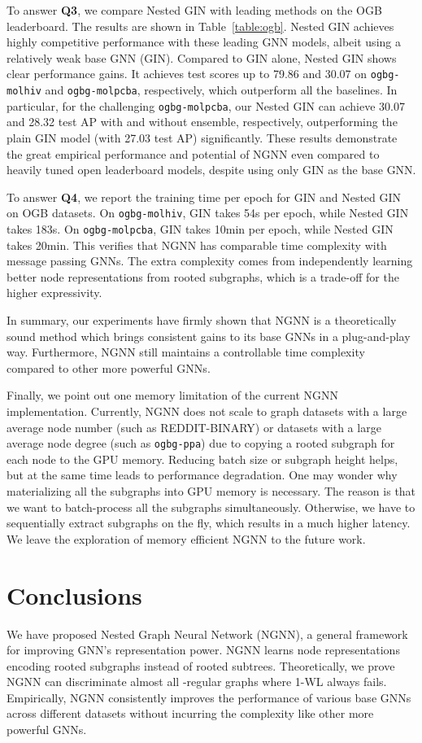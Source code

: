 \documentclass{article}
\begin{document}
To answer \textbf{Q3}, we compare Nested GIN with leading methods on the OGB leaderboard. The results are shown in Table~\ref{table:ogb}. Nested GIN achieves highly competitive performance with these leading GNN models, albeit using a relatively weak base GNN (GIN). Compared to GIN alone, Nested GIN shows clear performance gains. It achieves test scores up to 79.86 and 30.07 on \texttt{ogbg-molhiv} and \texttt{ogbg-molpcba}, respectively, which outperform all the baselines. In particular, for the challenging \texttt{ogbg-molpcba}, our Nested GIN can achieve 30.07 and 28.32 test AP with and without ensemble, respectively, outperforming the plain GIN model (with 27.03 test AP) significantly. These results demonstrate the great empirical performance and potential of NGNN even compared to heavily tuned open leaderboard models, despite using only GIN as the base GNN. 

To answer \textbf{Q4}, we report the training time per epoch for GIN and Nested GIN on OGB datasets. On \texttt{ogbg-molhiv}, GIN takes 54s per epoch, while Nested GIN takes 183s. On \texttt{ogbg-molpcba}, GIN takes 10min per epoch, while Nested GIN takes 20min. This verifies that NGNN has comparable time complexity with message passing GNNs. The extra complexity comes from independently learning better node representations from rooted subgraphs, which is a trade-off for the higher expressivity.

In summary, our experiments have firmly shown that NGNN is a theoretically sound method which brings consistent gains to its base GNNs in a plug-and-play way. Furthermore, NGNN still maintains a controllable time complexity compared to other more powerful GNNs. 

Finally, we point out one memory limitation of the current NGNN implementation. Currently, NGNN does not scale to graph datasets with a large average node number (such as REDDIT-BINARY) or datasets with a large average node degree (such as \texttt{ogbg-ppa}) due to copying a rooted subgraph for each node to the GPU memory. Reducing batch size or subgraph height helps, but at the same time leads to performance degradation. One may wonder why materializing all the subgraphs into GPU memory is necessary. The reason is that we want to batch-process all the subgraphs simultaneously. Otherwise, we have to sequentially extract subgraphs on the fly, which results in a much higher latency. We leave the exploration of memory efficient NGNN to the future work. 

\section{Conclusions}
We have proposed Nested Graph Neural Network (NGNN), a general framework for improving GNN's representation power. NGNN learns node representations encoding rooted subgraphs instead of rooted subtrees. Theoretically, we prove NGNN can discriminate almost all -regular graphs where 1-WL always fails. Empirically, NGNN consistently improves the performance of various base GNNs across different datasets without incurring the  complexity like other more powerful GNNs.
\end{document}
